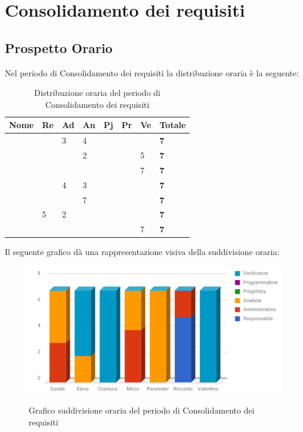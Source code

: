\documentclass[PianoDiProgetto.tex]{subfiles}
\begin{document}
\section{Consolidamento dei requisiti}
\subsection{Prospetto Orario}
Nel periodo di Consolidamento dei requisiti la distribuzione oraria è la seguente:
\begin{center}

\begin{table}[htbp]
	\centering
	\renewcommand\arraystretch{1.5}
	\begin{tabularx}{\textwidth}{p{4cm}|p{1cm}|p{1cm}|p{1cm}|p{1cm}|p{1cm}|p{1cm}|p{2cm}}
		\hline
		\textbf{Nome} & \textbf{Re} & \textbf{Ad} & \textbf{An} & \textbf{Pj} & \textbf{Pr} & \textbf{Ve} & \textbf{Totale} \\
		\hline
		\Davide & \ & 3 & 4 & \ & \ & \ & \textbf{7} \\
		\hline
		\Elena & \ & \ & 2 & \ & \ & 5 & \textbf{7} \\
		\hline
		\Gianluca & \ & \ & \ & \ & \ & 7 & \textbf{7} \\
		\hline
		\Mirco & \ & 4 & 3 & \ & \ & \ & \textbf{7} \\
		\hline
		\Parwinder & \ & \ & 7 & \ & \ & \ & \textbf{7} \\
		\hline
		\Riccardo & 5 & 2 & \ & \ & \ & \ & \textbf{7} \\
		\hline
		\Valentina & \ & \ & \ & \ & \ & 7 & \textbf{7} \\
		\hline
	\end{tabularx}
	\caption{Distribuzione oraria del periodo di Consolidamento dei requisiti}
	\label{my-label}
\end{table}
\end{center}
Il seguente grafico dà una rappresentazione visiva della suddivisione oraria:

\begin{figure}[h]
	\centering
	\includegraphics[width=12.5cm]{images/prospettoOrario/consolidamento.png}
	\label{fig:foo}
	\caption{Grafico suddivisione oraria del periodo di Consolidamento dei requisiti}
\end{figure} 
\end{document}
